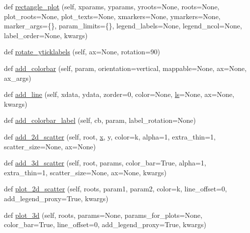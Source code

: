\begin{DoxyCompactItemize}
\item 
def \mbox{\hyperlink{classgetdist_1_1plots_1_1GetDistPlotter_a814e233ab36c48c3a3a34d4c837d4251}{rectangle\+\_\+plot}} (self, xparams, yparams, yroots=None, roots=None, plot\+\_\+roots=None, plot\+\_\+texts=None, xmarkers=None, ymarkers=None, marker\+\_\+args=\{\}, param\+\_\+limits=\{\}, legend\+\_\+labels=None, legend\+\_\+ncol=None, label\+\_\+order=None, kwargs)
\item 
def \mbox{\hyperlink{classgetdist_1_1plots_1_1GetDistPlotter_a695a45a9dff3c9be3b44d4b652dfc2df}{rotate\+\_\+yticklabels}} (self, ax=None, rotation=90)
\item 
def \mbox{\hyperlink{classgetdist_1_1plots_1_1GetDistPlotter_a624c60e696a6309dc60b7f67a168d65a}{add\+\_\+colorbar}} (self, param, orientation=\textquotesingle{}vertical\textquotesingle{}, mappable=None, ax=None, ax\+\_\+args)
\item 
def \mbox{\hyperlink{classgetdist_1_1plots_1_1GetDistPlotter_ad52c370b78987bc4e2f67dd242c89e0a}{add\+\_\+line}} (self, xdata, ydata, zorder=0, color=None, \mbox{\hyperlink{plotTT_8m_aac1113e50f7f1460beeaeeba69f63701}{ls}}=None, ax=None, kwargs)
\item 
def \mbox{\hyperlink{classgetdist_1_1plots_1_1GetDistPlotter_ae418e1e11ac0e54cec213eb7b1e8cec9}{add\+\_\+colorbar\+\_\+label}} (self, cb, param, label\+\_\+rotation=None)
\item 
def \mbox{\hyperlink{classgetdist_1_1plots_1_1GetDistPlotter_a3f9f0b8a62a5e803e002da9b1c40e248}{add\+\_\+2d\+\_\+scatter}} (self, root, \mbox{\hyperlink{plotTT_8m_a9336ebf25087d91c818ee6e9ec29f8c1}{x}}, y, color=\textquotesingle{}k\textquotesingle{}, alpha=1, extra\+\_\+thin=1, scatter\+\_\+size=None, ax=None)
\item 
def \mbox{\hyperlink{classgetdist_1_1plots_1_1GetDistPlotter_aef375df68dd9f9b2c7fa0b08ae851579}{add\+\_\+3d\+\_\+scatter}} (self, root, params, color\+\_\+bar=True, alpha=1, extra\+\_\+thin=1, scatter\+\_\+size=None, ax=None, kwargs)
\item 
def \mbox{\hyperlink{classgetdist_1_1plots_1_1GetDistPlotter_a20064a0721aea40476598a5a3a20df01}{plot\+\_\+2d\+\_\+scatter}} (self, roots, param1, param2, color=\textquotesingle{}k\textquotesingle{}, line\+\_\+offset=0, add\+\_\+legend\+\_\+proxy=True, kwargs)
\item 
def \mbox{\hyperlink{classgetdist_1_1plots_1_1GetDistPlotter_a47d2f31e3d3cb751152be571a867a503}{plot\+\_\+3d}} (self, roots, params=None, params\+\_\+for\+\_\+plots=None, color\+\_\+bar=True, line\+\_\+offset=0, add\+\_\+legend\+\_\+proxy=True, kwargs)

\end{DoxyCompactItemize}
